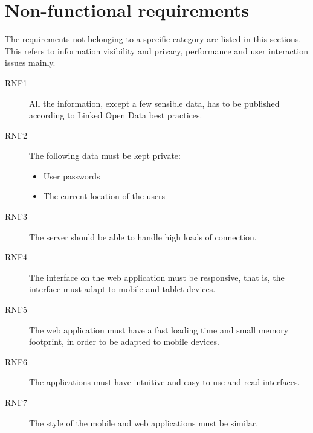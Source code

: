 \section{Non-functional requirements}

The requirements not belonging to a specific category are listed in this sections. This refers to information visibility and privacy, performance and user interaction issues mainly.

\begin{description}
\item[RNF1] All the information, except a few sensible data, has to be published according to Linked Open Data best practices.
\item[RNF2] The following data must be kept private:
  \begin{itemize}
  \item User passwords
  \item The current location of the users
  \end{itemize}
\item[RNF3] The server should be able to handle high loads of connection.
\item[RNF4] The interface on the web application must be responsive, that is, the interface must adapt to mobile and tablet devices.
\item[RNF5] The web application must have a fast loading time and small memory footprint, in order to be adapted to mobile devices.
\item[RNF6] The applications must have intuitive and easy to use and read interfaces.
\item[RNF7] The style of the mobile and web applications must be similar.
\end{description}